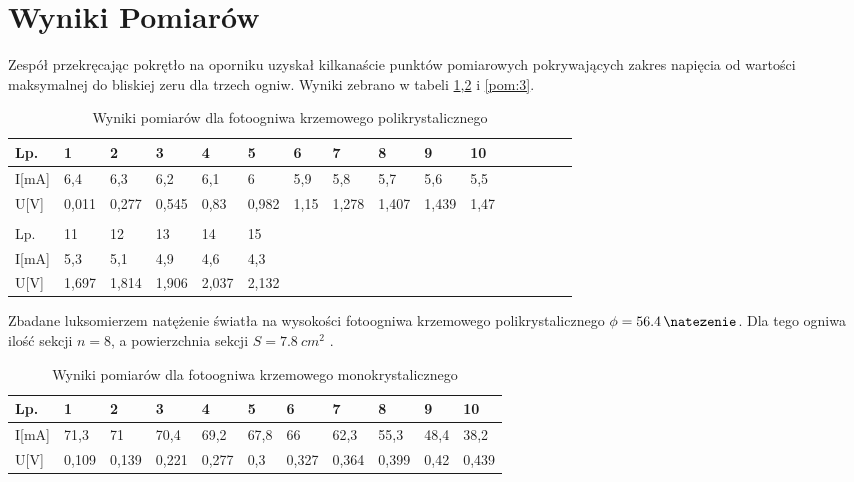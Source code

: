 \documentclass{article}
\begin{document}
\section{Wyniki Pomiarów}
Zespół przekręcając pokrętło na oporniku uzyskał kilkanaście punktów pomiarowych
pokrywających zakres napięcia od wartości maksymalnej do bliskiej zeru dla trzech ogniw. Wyniki zebrano w tabeli \ref{pom:1},\ref{pom:2} i \ref{pom:3}.
\begin{table}[!ht]
    \centering
    \begin{tabular}{|l|l|l|l|l|l|l|l|l|l|l|l|l|l|l|l|}
    \hline
        Lp. & 1 & 2 & 3 & 4 & 5 & 6 & 7 & 8 & 9 &10 \\ \hline   %
        I[mA] & 6,4 & 6,3 & 6,2 & 6,1 & 6 & 5,9 & 5,8 & 5,7 & 5,6 & 5,5 \\ \hline   %
        U[V] & 0,011 & 0,277 & 0,545 & 0,83 & 0,982 & 1,15 & 1,278 & 1,407 & 1,439 & 1,47\\ \hline \\ \hline %
         Lp.  & 11 & 12 & 13 & 14 & 15 & & &  & &  \\ \hline
        I[mA]  &5,3 & 5,1 & 4,9 & 4,6 & 4,3 & & & &  &  \\ \hline
        U[V]   & 1,697 & 1,814 & 1,906 & 2,037 & 2,132 & & & &  &   \\ \hline
    \end{tabular}
    \caption{Wyniki pomiarów dla fotoogniwa krzemowego polikrystalicznego}
    \label{pom:1}
\end{table}

Zbadane luksomierzem natężenie światła na wysokości fotoogniwa 
krzemowego polikrystalicznego $\phi = \SI{56.4}{\natezenie}$. 
Dla tego ogniwa ilość sekcji $n = 8$, a powierzchnia sekcji $S= \SI{7.8}{cm^2}$ .

\begin{table}[!ht]
    \centering
    \begin{tabular}{|l|l|l|l|l|l|l|l|l|l|l|}
    \hline
        Lp. & 1 & 2 & 3 & 4 & 5 & 6 & 7 & 8 & 9 & 10 \\ \hline
        I[mA] & 71,3 & 71 & 70,4 & 69,2 & 67,8 & 66 & 62,3 & 55,3 & 48,4 & 38,2 \\ \hline
        U[V] & 0,109 & 0,139 & 0,221 & 0,277 & 0,3 & 0,327 & 0,364 & 0,399 & 0,42 & 0,439 \\ \hline
    \end{tabular}
    \caption{Wyniki pomiarów dla fotoogniwa krzemowego monokrystalicznego}
     \label{pom:2}
\end{table}
\end{document}
